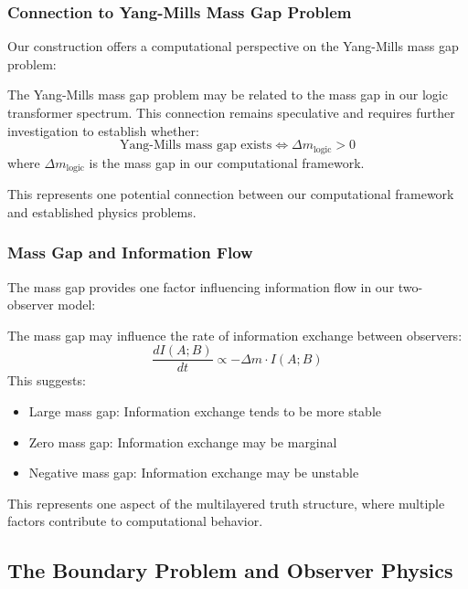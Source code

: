 \begin{theorem}
\subsubsection{Connection to Yang-Mills Mass Gap Problem}

Our construction offers a computational perspective on the Yang-Mills mass gap problem:

\begin{remark}
\label{rem:computational-yang-mills}
The Yang-Mills mass gap problem may be related to the mass gap in our logic transformer spectrum. This connection remains speculative and requires further investigation to establish whether:
\[
\text{Yang-Mills mass gap exists} \Leftrightarrow \Delta m_{\text{logic}} > 0
\]
where $\Delta m_{\text{logic}}$ is the mass gap in our computational framework.
\end{remark}

This represents one potential connection between our computational framework and established physics problems.

\subsubsection{Mass Gap and Information Flow}

The mass gap provides one factor influencing information flow in our two-observer model:

\begin{proposition}
\label{prop:mass-gap-info-flow}
The mass gap may influence the rate of information exchange between observers:
\[
\frac{dI(A;B)}{dt} \propto -\Delta m \cdot I(A;B)
\]
This suggests:
\begin{itemize}
\item Large mass gap: Information exchange tends to be more stable
\item Zero mass gap: Information exchange may be marginal
\item Negative mass gap: Information exchange may be unstable
\end{itemize}
\end{proposition}

This represents one aspect of the multilayered truth structure, where multiple factors contribute to computational behavior.

\subsection{The Boundary Problem and Observer Physics}


\end{theorem}

